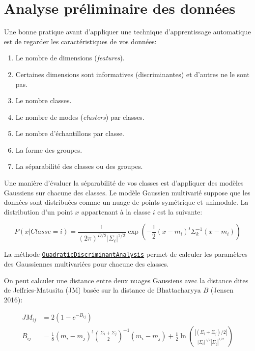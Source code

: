 \documentclass[
  french,
  11pt,
  letterpaper,
  open=any,
  twoside=false,
  french]{scrbook}
\begin{document}
\section{Analyse préliminaire des
données}\label{analyse-pruxe9liminaire-des-donnuxe9es}

Une bonne pratique avant d'appliquer une technique d'apprentissage
automatique est de regarder les caractéristiques de vos données:

\begin{enumerate}
\def\labelenumi{\arabic{enumi}.}
\item
  Le nombre de dimensions (\emph{features}).
\item
  Certaines dimensions sont informatives (discriminantes) et d'autres ne
  le sont pas.
\item
  Le nombre classes.
\item
  Le nombre de modes (\emph{clusters}) par classes.
\item
  Le nombre d'échantillons par classe.
\item
  La forme des groupes.
\item
  La séparabilité des classes ou des groupes.
\end{enumerate}

Une manière d'évaluer la séparabilité de vos classes est d'appliquer des
modèles Gaussiens sur chacune des classes. Le modèle Gaussien multivarié
suppose que les données sont distribuées comme un nuage de points
symétrique et unimodale. La distribution d'un point \(x\) appartenant à
la classe \(i\) est la suivante:

\[
P(x | Classe=i) = \frac{1}{(2\pi)^{D/2} |\Sigma_i|^{1/2}}\exp\left(-\frac{1}{2} (x-m_i)^t \Sigma_k^{-1} (x-m_i)\right)
\]

La méthode
\href{https://scikit-learn.org/stable/modules/generated/sklearn.discriminant_analysis.QuadraticDiscriminantAnalysis.html}{\texttt{QuadraticDiscriminantAnalysis}}
permet de calculer les paramètres des Gaussiennes multivariées pour
chacune des classes.

On peut calculer une distance entre deux nuages Gaussiens avec la
distance dites de Jeffries-Matusita (JM) basée sur la distance de
Bhattacharyya \(B\) (Jensen 2016):

\[
\begin{aligned}
JM_{ij} &= 2(1 - e^{-B_{ij}}) \\
B_{ij} &= \frac{1}{8}(m_i - m_j)^t \left( \frac{\Sigma_i + \Sigma_j}{2} \right)^{-1} (m_i - m_j) + \frac{1}{2} \ln \left( \frac{|(\Sigma_i + \Sigma_j)/2|}{|\Sigma_i|^{1/2} |\Sigma_j|^{1/2}} \right)
\end{aligned}
\]
\end{document}
